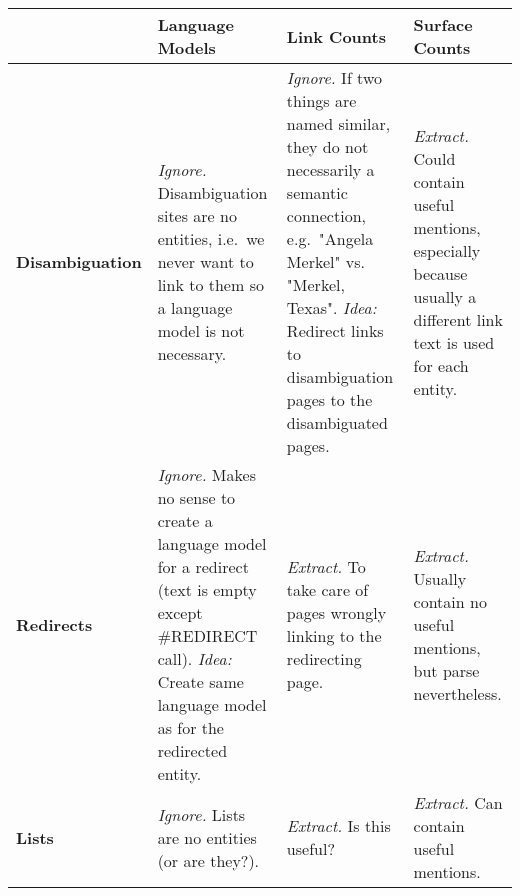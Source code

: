 \documentclass[a4paper, landscape]{article}
\begin{document}
\begin{longtable}{p{3cm}p{5cm}p{5cm}p{5cm}}
	\toprule
	& \textbf{Language Models} & \textbf{Link Counts} & \textbf{Surface Counts} \\

	\midrule
	\textbf{Disambiguation}
		& \emph{\checkmark Ignore.} Disambiguation sites are no entities, i.e.\ we never want to link to them so a language model is not necessary.
		& \emph{\checkmark Ignore.} If two things are named similar, they do not necessarily a semantic connection, e.g.\ "Angela Merkel" vs. "Merkel, Texas". \emph{Idea:} Redirect links to disambiguation pages to the disambiguated pages.
		& \emph{\checkmark Extract.} Could contain useful mentions, especially because usually a different link text is used for each entity.  \\
	\textbf{Redirects}
		& \emph{\checkmark Ignore.} Makes no sense to create a language model for a redirect (text is empty except \mbox{\#REDIRECT} call). \emph{Idea:} Create same language model as for the redirected entity.
		& \emph{\checkmark Extract.} To take care of pages wrongly linking to the redirecting page.
		& \emph{\checkmark Extract.} Usually contain no useful mentions, but parse nevertheless. \\
	\textbf{Lists}
		& \emph{\checkmark Ignore.} Lists are no entities (or are they?).
		& \emph{\checkmark Extract.} Is this useful?
		& \emph{\checkmark Extract.} Can contain useful mentions.

	\\\bottomrule
\end{longtable}
\end{document}
